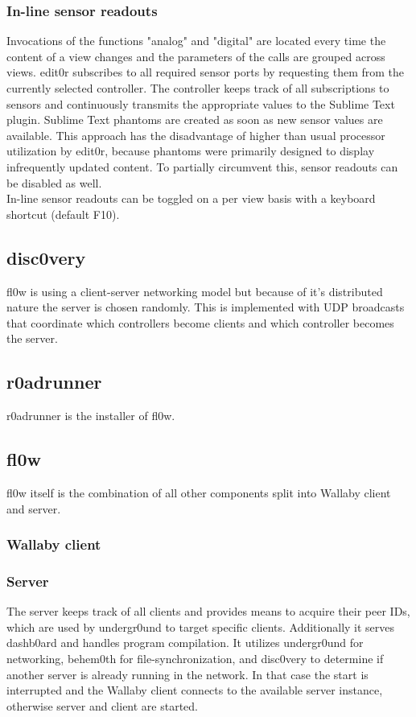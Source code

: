 \documentclass[conference]{IEEEtran}
\begin{document}
\subsubsection{In-line sensor readouts}
Invocations of the functions "analog" and "digital" are located every time the content of a view changes and the parameters of the calls are grouped across views. edit0r subscribes to all required sensor ports by requesting them from the currently selected controller. The controller keeps track of all subscriptions to sensors and continuously transmits the appropriate values to the Sublime Text\cite{Sublime Text 3:Sublime HQ} plugin. Sublime Text \cite{Sublime Text 3:Sublime HQ} phantoms are created as soon as new sensor values are available. This approach has the disadvantage of higher than usual processor utilization by edit0r, because phantoms were primarily designed to display infrequently updated content. To partially circumvent this, sensor readouts can be disabled as well.\\
In-line sensor readouts can be toggled on a per view basis with a keyboard shortcut (default F10).

\subsection{disc0very}
fl0w is using a client-server networking model but because of it's distributed nature the server is chosen randomly. This is implemented with UDP broadcasts that coordinate which controllers become clients and which controller becomes the server.

\subsection{r0adrunner}
r0adrunner is the installer of fl0w.

\subsection{fl0w}
fl0w itself is the combination of all other components split into Wallaby client and server. 

\subsubsection{Wallaby client}


\subsubsection{Server}
The server keeps track of all clients and provides means to acquire their peer IDs, which are used by undergr0und to target specific clients. Additionally it serves dashb0ard and handles program compilation. It utilizes undergr0und for networking, behem0th for file-synchronization, and disc0very to determine if another server is already running in the network. In that case the start is interrupted and the Wallaby client connects to the available server instance, otherwise server and client are started. 
\end{document}
